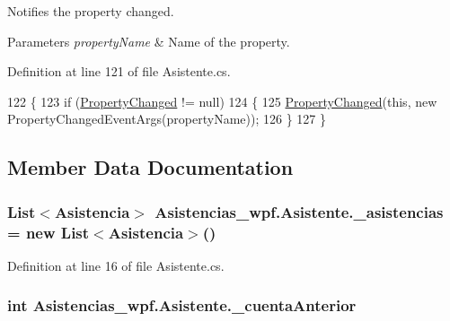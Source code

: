 Notifies the property changed. 


\begin{DoxyParams}{Parameters}
{\em property\-Name} & Name of the property.\\
\hline
\end{DoxyParams}


Definition at line 121 of file Asistente.\-cs.


\begin{DoxyCode}
122         \{
123             \textcolor{keywordflow}{if} (\hyperlink{class_asistencias__wpf_1_1_asistente_a1d1bb982d69d545e282360e1d0b57472}{PropertyChanged} != null)
124             \{
125                 \hyperlink{class_asistencias__wpf_1_1_asistente_a1d1bb982d69d545e282360e1d0b57472}{PropertyChanged}(\textcolor{keyword}{this}, \textcolor{keyword}{new} PropertyChangedEventArgs(propertyName));
126             \}
127         \}
\end{DoxyCode}


\subsection{Member Data Documentation}
\hypertarget{class_asistencias__wpf_1_1_asistente_a4496f6ac3f13327513b2d54b7e8c9de8}{
\subsubsection[{\-\_\-asistencias}]{\setlength{\rightskip}{0pt plus 5cm}List$<${\bf Asistencia}$>$ Asistencias\-\_\-wpf.\-Asistente.\-\_\-asistencias = new List$<${\bf Asistencia}$>$()\hspace{0.3cm}{\ttfamily [private]}}}\label{class_asistencias__wpf_1_1_asistente_a4496f6ac3f13327513b2d54b7e8c9de8}


Definition at line 16 of file Asistente.\-cs.

\hypertarget{class_asistencias__wpf_1_1_asistente_aafb8d9bcc27f0e6d1b5b7a24bfc84893}{
\subsubsection[{\-\_\-cuenta\-Anterior}]{\setlength{\rightskip}{0pt plus 5cm}int Asistencias\-\_\-wpf.\-Asistente.\-\_\-cuenta\-Anterior\hspace{0.3cm}{\ttfamily [private]}}}\label{class_asistencias__wpf_1_1_asistente_aafb8d9bcc27f0e6d1b5b7a24bfc84893}


